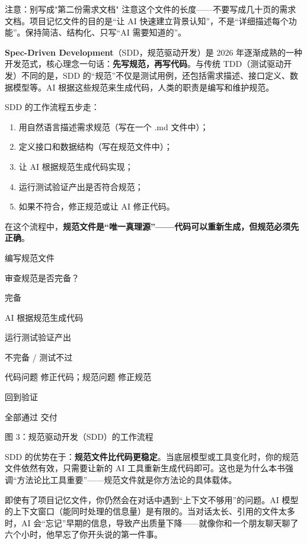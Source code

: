 \begin{tcbwarn}{注意：别写成"第二份需求文档"}
注意这个文件的长度——不要写成几十页的需求文档。项目记忆文件的目的是“让 AI 快速建立背景认知”，不是“详细描述每个功能”。保持简洁、结构化、只写“AI 需要知道的”。

\end{tcbwarn}


\textbf{Spec-Driven Development}（SDD，规范驱动开发）是 2026 年逐渐成熟的一种开发范式，核心理念一句话：\textbf{先写规范，再写代码}。与传统 TDD（测试驱动开发）不同的是，SDD 的“规范”不仅是测试用例，还包括需求描述、接口定义、数据模型等。AI 根据这些规范来生成代码，人类的职责是编写和维护规范。

SDD 的工作流程五步走：

\begin{enumerate}
  \item 用自然语言描述需求规范（写在一个 .md 文件中）；
  \item 定义接口和数据结构（写在规范文件中）；
  \item 让 AI 根据规范生成代码实现；
  \item 运行测试验证产出是否符合规范；
  \item 如果不符合，修正规范或让 AI 修正代码。
\end{enumerate}

在这个流程中，\textbf{规范文件是“唯一真理源”——代码可以重新生成，但规范必须先正确}。

编写规范文件

审查规范是否完备？

完备

AI 根据规范生成代码

运行测试验证产出

不完备 / 测试不过

代码问题 修正代码；规范问题 修正规范

回到验证

全部通过 交付

\begin{center}\small\color{gray}图 3：规范驱动开发（SDD）的工作流程\end{center}

SDD 的优势在于：\textbf{规范文件比代码更稳定}。当底层模型或工具变化时，你的规范文件依然有效，只需要让新的 AI 工具重新生成代码即可。这也是为什么本书强调“方法论比工具重要”——规范文件就是你方法论的具体载体。


即使有了项目记忆文件，你仍然会在对话中遇到“上下文不够用”的问题。AI 模型的上下文窗口（能同时处理的信息量）是有限的。当对话太长、引用的文件太多时，AI 会“忘记”早期的信息，导致产出质量下降——就像你和一个朋友聊天聊了六个小时，他早忘了你开头说的第一件事。

